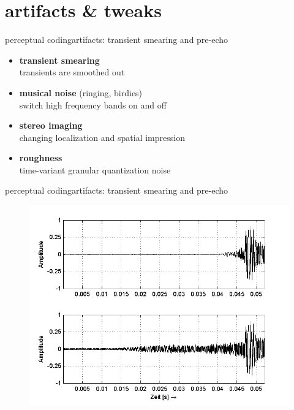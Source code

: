 \section[artifacts]{artifacts \& tweaks}	
	\begin{frame}{perceptual coding}{artifacts: transient smearing and pre-echo}
		\begin{itemize}
			\item	\textbf{transient smearing}\\
					transients are smoothed out
			\smallskip
            \item	\textbf{musical noise} (ringing, birdies)\\
					switch high frequency bands on and off
			\smallskip
            \item	\textbf{stereo imaging}\\
					changing localization and spatial impression
			\smallskip
            \item	\textbf{roughness}\\
					time-variant granular quantization noise
		\end{itemize}
	\end{frame}
	\begin{frame}{perceptual coding}{artifacts: transient smearing and pre-echo}
			\begin{figure}
				\centering
					\includegraphics[scale=0.5]{Graph/Lerch16-9}
			\end{figure}
	\end{frame}
	
